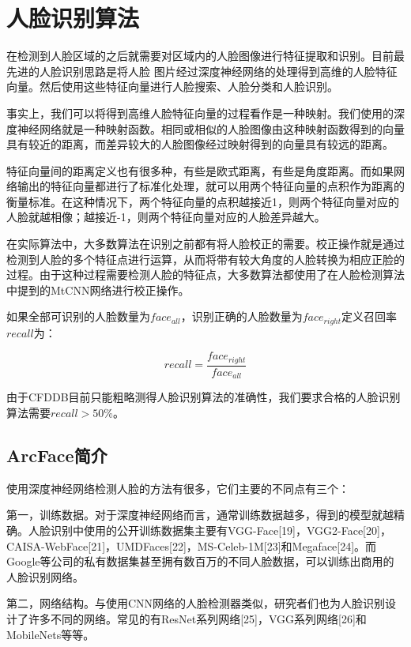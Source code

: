 \chapter{人脸识别算法}
\label{facerecognition}

在检测到人脸区域的之后就需要对区域内的人脸图像进行特征提取和识别。目前最先进的人脸识别思路是将人脸 图片经过深度神经网络的处理得到高维的人脸特征向量。然后使用这些特征向量进行人脸搜索、人脸分类和人脸识别。

事实上，我们可以将得到高维人脸特征向量的过程看作是一种映射。我们使用的深度神经网络就是一种映射函数。相同或相似的人脸图像由这种映射函数得到的向量具有较近的距离，而差异较大的人脸图像经过映射得到的向量具有较远的距离。

特征向量间的距离定义也有很多种，有些是欧式距离，有些是角度距离。而如果网络输出的特征向量都进行了标准化处理，就可以用两个特征向量的点积作为距离的衡量标准。在这种情况下，两个特征向量的点积越接近1，则两个特征向量对应的人脸就越相像；越接近-1，则两个特征向量对应的人脸差异越大。

在实际算法中，大多数算法在识别之前都有将人脸校正的需要。校正操作就是通过检测到人脸的多个特征点进行运算，从而将带有较大角度的人脸转换为相应正脸的过程。由于这种过程需要检测人脸的特征点，大多数算法都使用了在人脸检测算法中提到的MtCNN网络进行校正操作。

如果全部可识别的人脸数量为$face_{all}$，识别正确的人脸数量为$face_{right}$定义召回率$recall$为：

\begin{displaymath}
\label{eq:rrdef}
recall = \frac{face_{right}}{face_{all}} 
\end{displaymath}

由于CFDDB目前只能粗略测得人脸识别算法的准确性，我们要求合格的人脸识别算法需要$recall>50\%$。

\section{ArcFace简介}

使用深度神经网络检测人脸的方法有很多，它们主要的不同点有三个：

第一，训练数据。对于深度神经网络而言，通常训练数据越多，得到的模型就越精确。人脸识别中使用的公开训练数据集主要有VGG-Face[19]，VGG2-Face[20]，CAISA-WebFace[21]，UMDFaces[22]，MS-Celeb-1M[23]和Megaface[24]。而Google等公司的私有数据集甚至拥有数百万的不同人脸数据，可以训练出商用的人脸识别网络。

第二，网络结构。与使用CNN网络的人脸检测器类似，研究者们也为人脸识别设计了许多不同的网络。常见的有ResNet系列网络[25]，VGG系列网络[26]和MobileNets等等。

